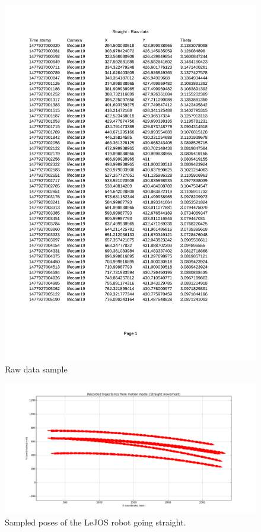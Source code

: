 \documentclass[paper=a4, fontsize=11pt]{scrartcl} %
\begin{document}
    \begin{figure}[H]
        \begin{center}
            \setlength{\fboxsep}{0.5pt} %
            \setlength{\fboxrule}{0.5pt}
            \includegraphics[width=12cm,fbox]{images/Raw_data}
            \caption{Raw data sample}
            \label{Raw_data}
        \end{center}
    \end{figure}

    \begin{figure}[H]
        \begin{center}
            \setlength{\fboxsep}{0.5pt} %
            \setlength{\fboxrule}{0.5pt}
            \includegraphics[width=\linewidth,fbox]{images/raw_straight.png}
            \caption{Sampled poses of the LeJOS robot going straight.}
        \end{center}
    \end{figure}
\end{document}

